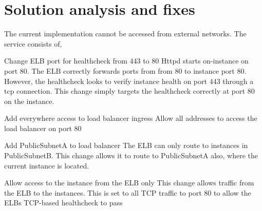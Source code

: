 \section{Solution analysis and fixes}

The current implementation cannot be accessed from external networks. The service consists of,



{Change ELB port for healthcheck from 443 to 80}
{
	Httpd starts on-instance on port 80. The ELB correctly forwards ports
	from from 80 to instance port 80.  However, the healthcheck looks to verify instance health on port 443 through a tcp connection. This change simply targets the healthcheck correctly at port 80 on the instance.
}
{}


{Add everywhere access to load balancer ingress}
{
Allow all addresses to access the load balancer on port 80
}
{}

{Add PublicSubnetA to load balancer}
{
The ELB can only route to instances in PublicSubnetB. This change
allows it to route to PublicSubnetA also, where the current instance is located.
}
{}

{Allow access to the instance from the ELB only}
{This change allows traffic from the ELB to the instances. This is set to all TCP traffic to port 80 to allow the ELBs TCP-based healthcheck to pass}
{}

